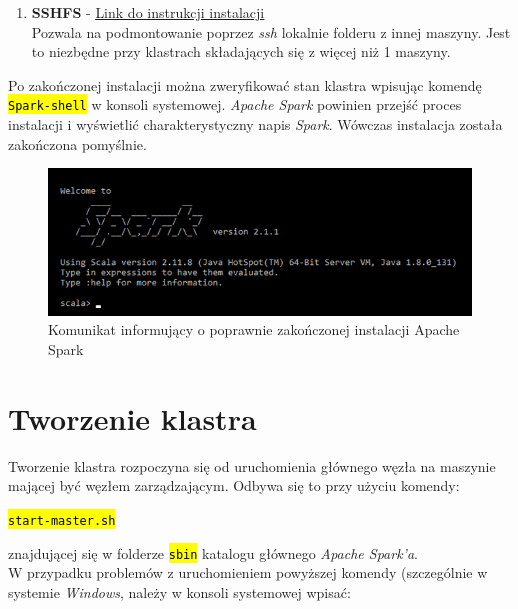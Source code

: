 \documentclass[a4paper,onecolumn,oneside,12pt]{memoir}
\begin{document}
{{\begin{enumerate}
\vspace{6mm}
\item {
\textbf{SSHFS} - \underline{\href{https://www.digitalocean.com/community/tutorials/how-to-use-sshfs-to-mount-remote-file-systems-over-ssh}{Link do instrukcji instalacji}} \\
Pozwala na podmontowanie poprzez \textit{ssh} lokalnie folderu z innej maszyny.
Jest to niezbędne przy klastrach składających się z więcej niż 1 maszyny.
}
\end{enumerate}
\vspace{6mm}
Po zakończonej instalacji można zweryfikować stan klastra wpisując komendę
{\texttt{\hl{Spark-shell}}} w konsoli systemowej. \textit{Apache Spark} powinien przejść proces instalacji i wyświetlić
charakterystyczny napis \textit{Spark}. Wówczas instalacja została zakończona pomyślnie.

\begin{figure}[h]
	\centering
	\includegraphics[width=1\linewidth]{spark-installed}
	\caption{Komunikat informujący o poprawnie zakończonej instalacji Apache Spark}
	\label{fig:stronaTytulowa}
\end{figure}



\pagebreak
\vspace*{1mm}
\section{Tworzenie klastra}
Tworzenie klastra rozpoczyna się od uruchomienia głównego węzła na maszynie
mającej być węzłem zarządzającym.
Odbywa się to przy użyciu komendy: \vspace{2mm}

\centerline{\texttt{\hl{start-master.sh}}}
\vspace{2mm} znajdującej się w folderze \texttt{\hl{sbin}} katalogu głównego \textit{Apache Spark'a}. \\
W przypadku problemów z uruchomieniem powyższej komendy (szczególnie w systemie \textit{Windows}, należy w konsoli systemowej wpisać: \vspace{2mm}

}}
\end{document}
